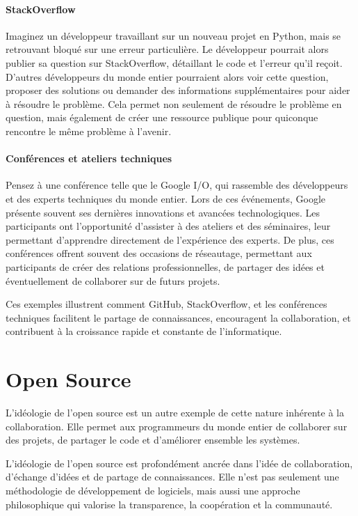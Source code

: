 \paragraph*{StackOverflow}  Imaginez un développeur travaillant sur un nouveau projet en Python, mais se retrouvant bloqué sur une erreur particulière. Le développeur pourrait alors publier sa question sur StackOverflow, détaillant le code et l'erreur qu'il reçoit. D'autres développeurs du monde entier pourraient alors voir cette question, proposer des solutions ou demander des informations supplémentaires pour aider à résoudre le problème. Cela permet non seulement de résoudre le problème en question, mais également de créer une ressource publique pour quiconque rencontre le même problème à l'avenir.

\paragraph*{Conférences et ateliers techniques} Pensez à une conférence telle que le Google I/O, qui rassemble des développeurs et des experts techniques du monde entier. Lors de ces événements, Google présente souvent ses dernières innovations et avancées technologiques. Les participants ont l'opportunité d'assister à des ateliers et des séminaires, leur permettant d'apprendre directement de l'expérience des experts. De plus, ces conférences offrent souvent des occasions de réseautage, permettant aux participants de créer des relations professionnelles, de partager des idées et éventuellement de collaborer sur de futurs projets.

Ces exemples illustrent comment GitHub, StackOverflow, et les conférences techniques facilitent le partage de connaissances, encouragent la collaboration, et contribuent à la croissance rapide et constante de l'informatique.


\section{Open Source} 
L'idéologie de l'open source est un autre exemple de cette nature inhérente à la collaboration. Elle permet aux programmeurs du monde entier de collaborer sur des projets, de partager le code et d'améliorer ensemble les systèmes.

L'idéologie de l'open source est profondément ancrée dans l'idée de collaboration, d'échange d'idées et de partage de connaissances. Elle n'est pas seulement une méthodologie de développement de logiciels, mais aussi une approche philosophique qui valorise la transparence, la coopération et la communauté.

